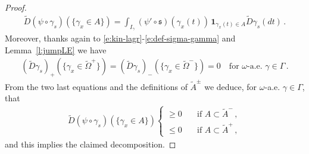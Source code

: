 \documentclass[fleqn
]{article}
\numberwithin{equation}{section}
\theoremstyle{definition}
\begin{document}
\begin{proof}
\begin{align*}
\tilde D(\psi\circ \gamma_s)(\lbrace \gamma_x\in A\rbrace)
= 
\int_{I_\gamma} (\psi'\circ \mathfrak s) (\gamma_x(t))\,
\mathbf 1_{\gamma_x(t)\in A} 
\tilde D\gamma_s(dt)\,.
\end{align*}
Moreover, thanks again to \eqref{e:kin-lagr}-\eqref{e:def-sigma-gamma} and Lemma~\ref{l:jumpLE} we have
\begin{align*}
(\tilde D\gamma_s)_+(\{\gamma_x \in \tilde\Omega^+\})=(\tilde D\gamma_s)_-(\{ \gamma_x \in \tilde\Omega^-\})=0\quad\text{for }\omega\text{-a.e. }\gamma\in\Gamma\,.
\end{align*}
From the two last equations and the definitions of $\tilde A^\pm$ we deduce, for $\omega$-a.e. $\gamma\in\Gamma$, that
\begin{align*}
\tilde D(\psi\circ \gamma_s)(\lbrace \gamma_x\in A\rbrace)
\begin{cases}
\geq 0\quad
&\text{if }A\subset \tilde A^-\,,
\\
\leq 0\quad
&\text{if }A\subset \tilde A^+\,,
\end{cases}
\end{align*}
and this implies the claimed decomposition.
\end{proof}
\end{document}
